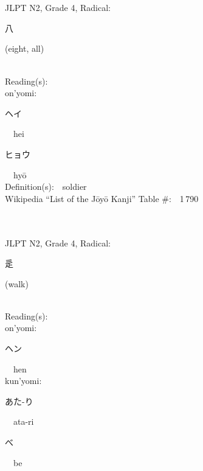 \begin{multicols}{2}
\ \ \\
{\fontsize{34pt}{40pt}  }\ \ \\  %
{JLPT N2, Grade 4, Radical:\ \ {\begin{CJK}{UTF8}{min} 八 \end{CJK}} (eight, all) } \\
Reading(s):\ \ \\
{\hspace*{1em}}on'yomi:\ \ \\
{\hspace*{2em}}{\begin{CJK}{UTF8}{min} ヘイ \end{CJK}}\ \ hei\ \ \\
{\hspace*{2em}}{\begin{CJK}{UTF8}{min} ヒョウ \end{CJK}}\ \ hy\=o\ \ \\
Definition(s):\ \ soldier \\
Wikipedia ``List of the J\=oy\=o Kanji'' Table \#:\ \ 1\,790 \\
\ \ \\
{\fontsize{34pt}{40pt}  }\ \ \\  %
{JLPT N2, Grade 4, Radical:\ \ {\begin{CJK}{UTF8}{min} 辵 \end{CJK}} (walk) } \\
Reading(s):\ \ \\
{\hspace*{1em}}on'yomi:\ \ \\
{\hspace*{2em}}{\begin{CJK}{UTF8}{min} ヘン \end{CJK}}\ \ hen\ \ \\
{\hspace*{1em}}kun'yomi:\ \ \\
{\hspace*{2em}}{\begin{CJK}{UTF8}{min} あた-り \end{CJK}}\ \ ata-ri\ \ \\
{\hspace*{2em}}{\begin{CJK}{UTF8}{min} べ \end{CJK}}\ \ be\ \ \\

\end{multicols}
